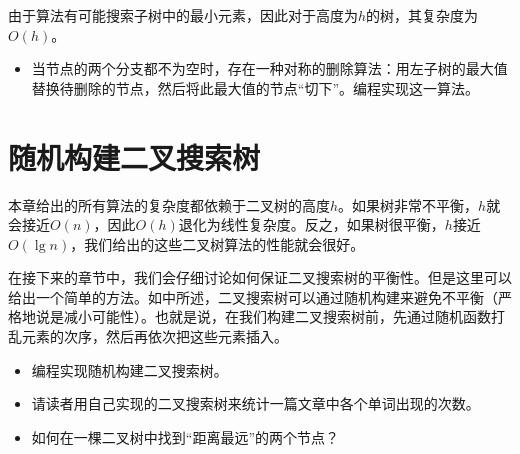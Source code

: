 \documentclass[UTF8]{article}
\begin{document}
由于算法有可能搜索子树中的最小元素，因此对于高度为$h$的树，其复杂度为$O(h)$。

\begin{Exercise}

\begin{itemize}
\item 当节点的两个分支都不为空时，存在一种对称的删除算法：用左子树的最大值替换待删除的节点，然后将此最大值的节点“切下”。编程实现这一算法。
\end{itemize}

\end{Exercise}

\section{随机构建二叉搜索树}

本章给出的所有算法的复杂度都依赖于二叉树的高度$h$。如果树非常不平衡，$h$就会接近$O(n)$，因此$O(h)$退化为线性复杂度。反之，如果树很平衡，$h$接近$O(\lg n)$，我们给出的这些二叉树算法的性能就会很好。

在接下来的章节中，我们会仔细讨论如何保证二叉搜索树的平衡性。但是这里可以给出一个简单的方法。如\cite{CLRS}中所述，二叉搜索树可以通过随机构建来避免不平衡（严格地说是减小可能性）。也就是说，在我们构建二叉搜索树前，先通过随机函数打乱元素的次序，然后再依次把这些元素插入。

\begin{Exercise}

\begin{itemize}
\item 编程实现随机构建二叉搜索树。
\item 请读者用自己实现的二叉搜索树来统计一篇文章中各个单词出现的次数。
\item 如何在一棵二叉树中找到“距离最远”的两个节点？
\end{itemize}

\end{Exercise}
\end{document}
